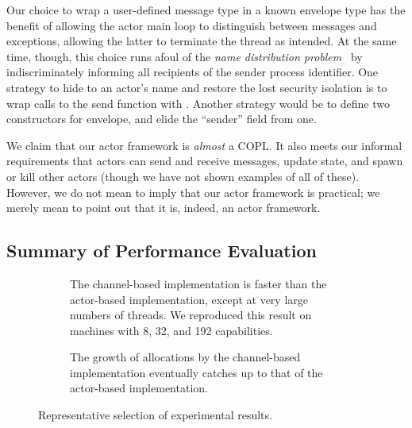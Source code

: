 \documentclass[sigplan,screen]{acmart}
\begin{document}
Our choice to wrap a user-defined message type in a known envelope type has the
benefit of allowing the actor main loop to distinguish between messages and
exceptions, allowing the latter to terminate the thread as intended.
%
At the same time, though, this choice runs afoul of the \emph{name distribution problem}~\cite{armstrong2003} by indiscriminately informing all recipients of the sender
process identifier.
%
One strategy to hide to an actor's name and restore the lost security isolation is
to wrap calls to the send function with .
%
Another strategy would be to define two constructors for envelope, and elide
the ``sender'' field from one.

We claim that our actor framework is \emph{almost} a COPL.
%
It also meets our informal requirements that actors can send and receive
messages, update state, and spawn or kill other actors (though we have not
shown examples of all of these).
%
However, we do not mean to imply that our actor framework is practical; we
merely mean to point out that it is, indeed, an actor framework.





\subsection{Summary of Performance Evaluation}


\begin{figure}
\raggedright

    \begin{subfigure}{\linewidth}
        \begin{small}
        \def\svgwidth{\linewidth}
        
        \end{small}
        \caption{
            The channel-based implementation is faster than the actor-based
            implementation, except at very large numbers of threads.
            We reproduced this result on machines with 8, 32, and 192 capabilities.
        }
        \label{fig:perf-eval-time-n32}
    \end{subfigure}

    \begin{subfigure}{\linewidth}
        \begin{small}
        \def\svgwidth{\linewidth}
        
        \end{small}
        \caption{
            The growth of allocations by the channel-based implementation
            eventually catches up to that of the actor-based implementation.
        }
        \label{fig:perf-eval-mem}
    \end{subfigure}

\caption{Representative selection of experimental results.}
\label{fig:perf-eval}
\end{figure}
\end{document}
